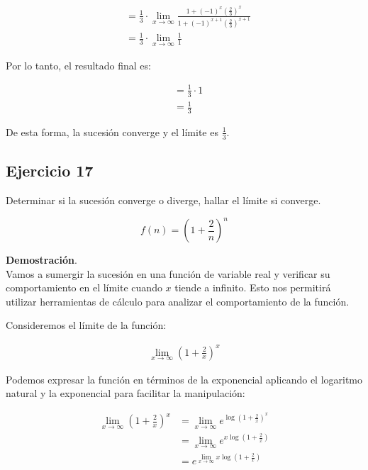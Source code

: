 \documentclass{article}
\begin{document}
    \begin{align*}
    & =\frac{1}{3} \cdot \lim _{x \rightarrow \infty} \frac{1+(-1)^{x}\left(\frac{2}{3}\right)^{x}}{1+(-1)^{x+1}\left(\frac{2}{3}\right)^{x+1}} \\
    & =\frac{1}{3} \cdot \lim _{x \rightarrow \infty} \frac{1}{1}
    \end{align*}

    Por lo tanto, el resultado final es:

    \begin{align*}
    & =\frac{1}{3} \cdot 1 \\
    & =\frac{1}{3}
    \end{align*}

    De esta forma, la sucesión converge y el límite es \(\frac{1}{3}\).

    \subsection*{Ejercicio 17}

    Determinar si la sucesión converge o diverge, hallar el límite si converge.

    $$
    f(n)=\left(1+\frac{2}{n}\right)^{n}
    $$

    \textbf{Demostración}.\\

    Vamos a sumergir la sucesión en una función de variable real y verificar su comportamiento en el límite cuando \( x \) tiende a infinito. Esto nos permitirá utilizar herramientas de cálculo para analizar el comportamiento de la función.

    Consideremos el límite de la función:

    \begin{align*}
    \lim_{x \rightarrow \infty}\left(1+\frac{2}{x}\right)^{x}
    \end{align*}

    Podemos expresar la función en términos de la exponencial aplicando el logaritmo natural y la exponencial para facilitar la manipulación:

    \begin{align*}
    \lim_{x \rightarrow \infty}\left(1+\frac{2}{x}\right)^{x} &= \lim_{x \rightarrow \infty} e^{\log \left(1+\frac{2}{x}\right)^{x}} \\
    &= \lim_{x \rightarrow \infty} e^{x \log \left(1+\frac{2}{x}\right)} \\
    &= e^{\lim_{x \rightarrow \infty} x \log \left(1+\frac{2}{x}\right)}
    \end{align*}
\end{document}
